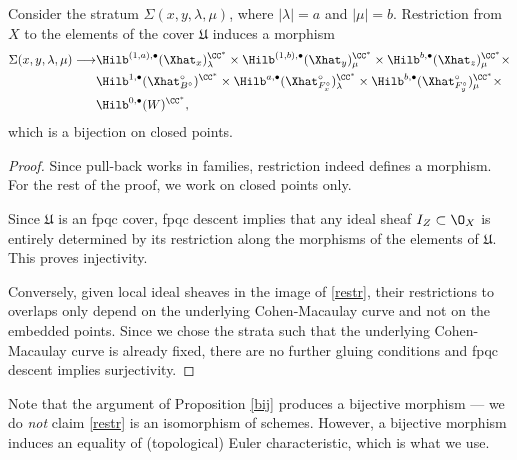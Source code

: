 \begin{proposition} \label{bij}
Consider the stratum $\Sigma(x,y,\lambda,\mu)$, where $|\lambda|=a$ and $|\mu|=b$. Restriction from $X$ to the elements of the cover $\mathfrak{U}$ induces a morphism
\begin{align}
\begin{split} \label{restr}
\Sigma(x,y,\lambda,\mu) \longrightarrow &\Hilb^{(1,a),\bullet}(\Xhat _x)_{\lambda}^{\CC^*} \times \Hilb^{(1,b),\bullet}(\Xhat _y)_{\mu}^{\CC^*} \times \Hilb^{b,\bullet}(\Xhat _z)_{\mu}^{\CC^*} \times \\
&\Hilb^{1,\bullet}(\Xhat ^{\circ}_{B^\circ})^{\CC^*} \times \Hilb^{a,\bullet}(\Xhat ^{\circ}_{F_{x}^{\circ}})_{\lambda}^{\CC^*} \times \Hilb^{b,\bullet}(\Xhat ^{\circ}_{F_{y}^{\circ}})_{\mu}^{\CC^*} \times \\
&\Hilb^{0,\bullet}(W)^{\CC^*},
\end{split}
\end{align}
which is a bijection on closed points.
\end{proposition}
\begin{proof}
Since pull-back works in families, restriction indeed defines a morphism. For the rest of the proof, we work on closed points only.

Since $\mathfrak{U}$ is an fpqc cover, fpqc descent implies that any ideal sheaf $I_Z \subset \O_X$ is entirely determined by its restriction along the morphisms of the elements of $\mathfrak{U}$. This proves injectivity.

Conversely, given local ideal sheaves in the image of \eqref{restr},
their restrictions to overlaps only depend on the underlying
Cohen-Macaulay curve and not on the embedded points. Since we chose
the strata such that the underlying Cohen-Macaulay curve is already
fixed, there are no further gluing conditions and fpqc descent implies
surjectivity.
\end{proof}
   
\begin{remark}
Note that the argument of Proposition \ref{bij} produces a bijective
morphism --- we do \emph{not} claim \eqref{restr} is an
isomorphism of schemes. However, a bijective morphism induces an
equality of (topological) Euler characteristic, which is what we use.
\end{remark}

